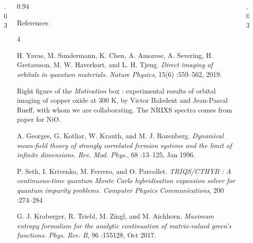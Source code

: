 \documentclass[final, hyperref={pdfpagelabels=false}]{beamer}
\begin{document}
\begin{frame}[t]

\begin{columns}[t]  %

\begin{column}{.03\textwidth}
\end{column} %

\begin{column}{0.94\textwidth}
%
\begin{block}{\color{gray!10} \normalsize References}
{\footnotesize
\begin{thebibliography}{4}

H. Yavas, M. Sundermann, K. Chen, A. Amorese, A. Severing, H. Gretarsson, M. W. Haverkort, and L. H. Tjeng. \textit{Direct imaging of orbitals in quantum materials. Nature Physics}, 15(6) :559–562, 2019.

Right figure of the \textit{Motivation} box : experimental results of orbital imaging of copper oxide at $300$ K, by Victor Baledent and Jean-Pascal Rueff, with whom we are collaborating. The NRIXS spectra comes from paper \cite{Yavas2019} for NiO.

A. Georges, G. Kotliar, W. Krauth, and M. J. Rozenberg. \textit{Dynamical mean-field theory of strongly correlated fermion systems and the limit of infinite dimensions. Rev. Mod. Phys.}, 68 :13–125, Jan 1996.

P. Seth, I. Krivenko, M. Ferrero, and O. Parcollet. \textit{TRIQS/CTHYB : A continuous-time quantum Monte Carlo hybridisation expansion solver for quantum impurity problems. Computer Physics Communications}, 200 :274–284

G. J. Kraberger, R. Triebl, M. Zingl, and M. Aichhorn. \textit{Maximum entropy formalism for the analytic continuation of matrix-valued green’s functions. Phys. Rev. B}, 96 :155128, Oct 2017.

\end{thebibliography}
 }
\end{block}
\end{column}

\begin{column}{.03\textwidth}
\end{column} %
\end{columns}



\end{frame} %
\end{document}
